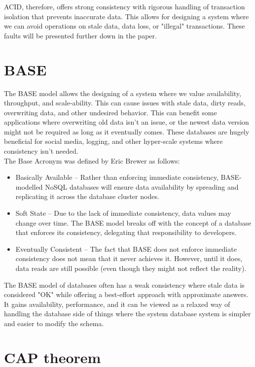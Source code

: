 \documentclass[a4paper,10pt,titlepage]{report}
\begin{document}
ACID, therefore, offers strong consistency with rigorous handling of transaction isolation that prevents inaccurate data. This allows for designing a system where we can avoid operations on stale data, data loss, or "illegal" transactions. These faults will be presented further down in the paper.


\section{BASE}
The BASE model allows the designing of a system where we value availability, throughput, and scale-ability. This can cause issues with stale data, dirty reads, overwriting data, and other undesired behavior. This can benefit some applications where overwriting old data isn't an issue, or the newest data version might not be required as long as it eventually comes. These databases are hugely beneficial for social media, logging, and other hyper-scale systems where consistency isn't needed.\\
\vspace{5mm}
The Base Acronym was defined by Eric Brewer\cite{brewer2000towards} as follows:

\begin{itemize}
    \item Basically Available – Rather than enforcing immediate consistency, BASE-modelled NoSQL databases will ensure data availability by spreading and replicating it across the database cluster nodes.
    \item Soft State – Due to the lack of immediate consistency, data values may change over time. The BASE model breaks off with the concept of a database that enforces its consistency, delegating that responsibility to developers.
    \item Eventually Consistent – The fact that BASE does not enforce immediate consistency does not mean that it never achieves it. However, until it does, data reads are still possible (even though they might not reflect the reality).
\end{itemize}

The BASE model of databases often has a weak consistency where stale data is considered "OK" while offering a best-effort approach with approximate answers. It gains availability, performance, and it can be viewed as a relaxed way of handling the database side of things where the system database system is simpler and easier to modify the schema.

\section{CAP theorem}
\end{document}
